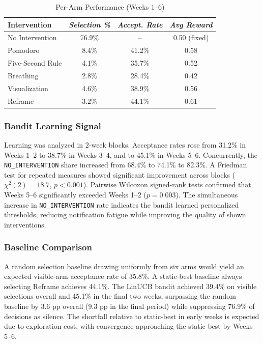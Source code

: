\documentclass[conference]{IEEEtran}
\begin{document}
\begin{table}[htbp]
\caption{Per-Arm Performance (Weeks 1--6)}
\label{tab_arm_performance}
\begin{center}
\footnotesize
\begin{tabular}{|p{2.0cm}|c|c|c|}
\hline
\textbf{Intervention} & \textbf{\textit{Selection \%}} & \textbf{\textit{Accept. Rate}} & \textbf{\textit{Avg Reward}} \\
\hline
No Intervention & 76.9\% & -- & 0.50 (fixed) \\
\hline
Pomodoro & 8.4\% & 41.2\% & 0.58 \\
\hline
Five-Second Rule & 4.1\% & 35.7\% & 0.52 \\
\hline
Breathing & 2.8\% & 28.4\% & 0.42 \\
\hline
Visualization & 4.6\% & 38.9\% & 0.56 \\
\hline
Reframe & 3.2\% & 44.1\% & 0.61 \\
\hline
\end{tabular}
\end{center}
\end{table}

\subsubsection{Bandit Learning Signal}
Learning was analyzed in 2-week blocks. Acceptance rates rose from 31.2\% in Weeks 1--2 to 38.7\% in Weeks 3--4, and to 45.1\% in Weeks 5--6. Concurrently, the \texttt{NO\_INTERVENTION} share increased from 68.4\% to 74.1\% to 82.3\%. A Friedman test for repeated measures showed significant improvement across blocks ($\chi^2(2) = 18.7$, $p < 0.001$). Pairwise Wilcoxon signed-rank tests confirmed that Weeks 5--6 significantly exceeded Weeks 1--2 ($p = 0.003$). The simultaneous increase in \texttt{NO\_INTERVENTION} rate indicates the bandit learned personalized thresholds, reducing notification fatigue while improving the quality of shown interventions.

\subsubsection{Baseline Comparison}
A random selection baseline drawing uniformly from six arms would yield an expected visible-arm acceptance rate of 35.8\%. A static-best baseline always selecting Reframe achieves 44.1\%. The LinUCB bandit achieved 39.4\% on visible selections overall and 45.1\% in the final two weeks, surpassing the random baseline by 3.6 pp overall (9.3 pp in the final period) while suppressing 76.9\% of decisions as silence. The shortfall relative to static-best in early weeks is expected due to exploration cost, with convergence approaching the static-best by Weeks 5--6.
\end{document}
